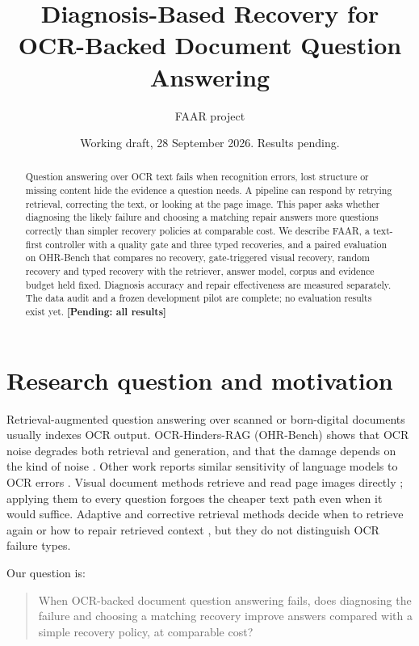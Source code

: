 \documentclass[10pt]{article}
\title{Diagnosis-Based Recovery for OCR-Backed Document Question Answering}
\author{FAAR project}
\date{Working draft, 28 September 2026. Results pending.}
\newcommand{\pending}[1]{\textbf{[Pending: #1]}}
\begin{document}
\maketitle

\begin{abstract}
Question answering over OCR text fails when recognition errors, lost structure or missing content hide the evidence a question needs. A pipeline can respond by retrying retrieval, correcting the text, or looking at the page image. This paper asks whether diagnosing the likely failure and choosing a matching repair answers more questions correctly than simpler recovery policies at comparable cost. We describe FAAR, a text-first controller with a quality gate and three typed recoveries, and a paired evaluation on OHR-Bench that compares no recovery, gate-triggered visual recovery, random recovery and typed recovery with the retriever, answer model, corpus and evidence budget held fixed. Diagnosis accuracy and repair effectiveness are measured separately. The data audit and a frozen development pilot are complete; no evaluation results exist yet. \pending{all results}
\end{abstract}

\section{Research question and motivation}

Retrieval-augmented question answering over scanned or born-digital documents usually indexes OCR output. OCR-Hinders-RAG (OHR-Bench) shows that OCR noise degrades both retrieval and generation, and that the damage depends on the kind of noise \citep{zhang2025ocrhinders}. Other work reports similar sensitivity of language models to OCR errors \citep{piryani2025multiocrqa}. Visual document methods retrieve and read page images directly \citep{tanaka2025vdocrag,wang2025vidorag}; applying them to every question forgoes the cheaper text path even when it would suffice. Adaptive and corrective retrieval methods decide when to retrieve again or how to repair retrieved context \citep{jiang2023flare,asai2024selfrag,yan2024crag,jeong2024adaptiverag}, but they do not distinguish OCR failure types.

Our question is:

\begin{quote}
When OCR-backed document question answering fails, does diagnosing the failure and choosing a matching recovery improve answers compared with a simple recovery policy, at comparable cost?
\end{quote}
\end{document}
